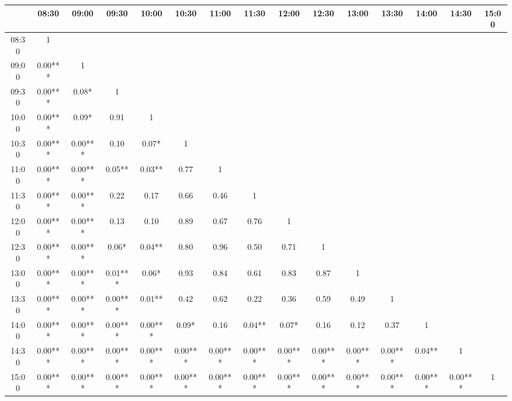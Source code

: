 \begin{table}[h]
\begin{threeparttable}
\begin{subtable}[t]{\linewidth}
\begin{tabular}{|c|cccccccccccccc}
& 08:30   & 09:00   & 09:30   & 10:00   & 10:30   & 11:00   & 11:30   & 12:00   & 12:30   & 13:00   & 13:30   & 14:00  & 14:30 & 15:00 \\ \midrule
08:30 & 1       &         &         &         &         &         &         &         &         &         &         &        &       &       \\
09:00 & 0.00*** & 1       &         &         &         &         &         &         &         &         &         &        &       &       \\
09:30 & 0.00*** & 0.08*   & 1       &         &         &         &         &         &         &         &         &        &       &       \\
10:00 & 0.00*** & 0.09*   & 0.91    & 1       &         &         &         &         &         &         &         &        &       &       \\
10:30 & 0.00*** & 0.00*** & 0.10    & 0.07*   & 1       &         &         &         &         &         &         &        &       &       \\
11:00 & 0.00*** & 0.00*** & 0.05**  & 0.03**  & 0.77    & 1       &         &         &         &         &         &        &       &       \\
11:30 & 0.00*** & 0.00*** & 0.22    & 0.17    & 0.66    & 0.46    & 1       &         &         &         &         &        &       &       \\
12:00 & 0.00*** & 0.00*** & 0.13    & 0.10    & 0.89    & 0.67    & 0.76    & 1       &         &         &         &        &       &       \\
12:30 & 0.00*** & 0.00*** & 0.06*   & 0.04**  & 0.80    & 0.96    & 0.50    & 0.71    & 1       &         &         &        &       &       \\
13:00 & 0.00*** & 0.00*** & 0.01*** & 0.06*   & 0.93    & 0.84    & 0.61    & 0.83    & 0.87    & 1       &         &        &       &       \\
13:30 & 0.00*** & 0.00*** & 0.00*** & 0.01**  & 0.42    & 0.62    & 0.22    & 0.36    & 0.59    & 0.49    & 1       &        &       &       \\
14:00 & 0.00*** & 0.00*** & 0.00*** & 0.00*** & 0.09*   & 0.16    & 0.04**  & 0.07*   & 0.16    & 0.12    & 0.37    & 1      &       &       \\
14:30 & 0.00*** & 0.00*** & 0.00*** & 0.00*** & 0.00*** & 0.00*** & 0.00*** & 0.00*** & 0.00*** & 0.00*** & 0.00*** & 0.04** & 1     &       \\
15:00 & 0.00*** & 0.00*** & 0.00*** & 0.00*** & 0.00*** & 0.00*** & 0.00*** & 0.00*** & 0.00*** & 0.00*** & 0.00*** & 0.00*** & 0.00***& 1   \\
\bottomrule


\end{tabular}
\end{subtable}
\end{threeparttable}
\end{table}
